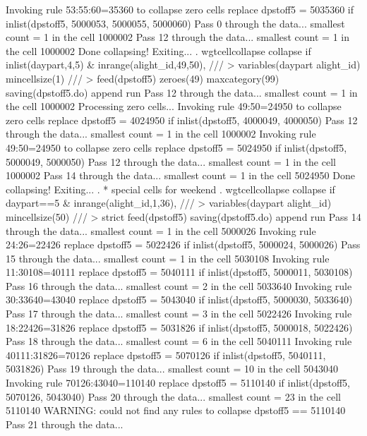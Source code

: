   Invoking rule 53:55:60=35360 to collapse zero cells
  replace dpstoff5 = 5035360 if inlist(dpstoff5, 5000053, 5000055, 5000060)
Pass 0 through the data...
  smallest count = 1 in the cell      1000002
Pass 12 through the data...
  smallest count = 1 in the cell      1000002
  Done collapsing! Exiting...
{\smallskip}
. wgtcellcollapse collapse if inlist(daypart,4,5) \& inrange(alight_id,49,50), ///
>         variables(daypart alight_id) mincellsize(1) ///
>         feed(dpstoff5) zeroes(49) maxcategory(99) saving(dpstoff5.do) append run
Pass 12 through the data...
  smallest count = 1 in the cell      1000002
{\smallskip}
Processing zero cells...
{\smallskip}
  Invoking rule 49:50=24950 to collapse zero cells
  replace dpstoff5 = 4024950 if inlist(dpstoff5, 4000049, 4000050)
Pass 12 through the data...
  smallest count = 1 in the cell      1000002
  Invoking rule 49:50=24950 to collapse zero cells
  replace dpstoff5 = 5024950 if inlist(dpstoff5, 5000049, 5000050)
Pass 12 through the data...
  smallest count = 1 in the cell      1000002
Pass 14 through the data...
  smallest count = 1 in the cell      5024950
  Done collapsing! Exiting...
{\smallskip}
. * special cells for weekend
. wgtcellcollapse collapse if daypart==5 \& inrange(alight_id,1,36), ///
>         variables(daypart alight_id) mincellsize(50) ///
>         strict feed(dpstoff5) saving(dpstoff5.do) append run
Pass 14 through the data...
  smallest count = 1 in the cell      5000026
  Invoking rule 24:26=22426
  replace dpstoff5 = 5022426 if inlist(dpstoff5, 5000024, 5000026)
Pass 15 through the data...
  smallest count = 1 in the cell      5030108
  Invoking rule 11:30108=40111
  replace dpstoff5 = 5040111 if inlist(dpstoff5, 5000011, 5030108)
Pass 16 through the data...
  smallest count = 2 in the cell      5033640
  Invoking rule 30:33640=43040
  replace dpstoff5 = 5043040 if inlist(dpstoff5, 5000030, 5033640)
Pass 17 through the data...
  smallest count = 3 in the cell      5022426
  Invoking rule 18:22426=31826
  replace dpstoff5 = 5031826 if inlist(dpstoff5, 5000018, 5022426)
Pass 18 through the data...
  smallest count = 6 in the cell      5040111
  Invoking rule 40111:31826=70126
  replace dpstoff5 = 5070126 if inlist(dpstoff5, 5040111, 5031826)
Pass 19 through the data...
  smallest count = 10 in the cell      5043040
  Invoking rule 70126:43040=110140
  replace dpstoff5 = 5110140 if inlist(dpstoff5, 5070126, 5043040)
Pass 20 through the data...
  smallest count = 23 in the cell      5110140
  WARNING: could not find any rules to collapse dpstoff5 == 5110140
Pass 21 through the data...
